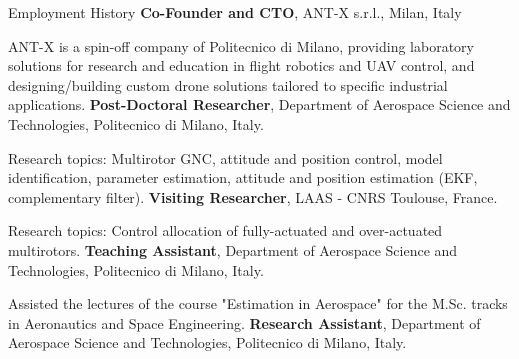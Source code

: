 \begin{rubric}{Employment History}
\entry*[02/20 -- 06/24]
	\textbf{Co-Founder and CTO}, ANT-X s.r.l., Milan, Italy

    ANT-X is a spin-off company of Politecnico di Milano, providing laboratory solutions for research and education in flight robotics and UAV control, and designing/building custom drone solutions tailored to specific industrial applications.    
%
\entry*[02/20 -- 10/22]
	\textbf{Post-Doctoral Researcher}, Department of Aerospace Science and Technologies, Politecnico di Milano, Italy.

    Research topics: Multirotor GNC, attitude and position control, model identification, parameter estimation, attitude and position estimation (EKF, complementary filter). 
%
\entry*[03/19 -- 07/19]
	\textbf{Visiting Researcher}, LAAS - CNRS Toulouse, France.
 
   Research topics: Control allocation of fully-actuated and over-actuated multirotors.
%
\entry*[2018 -- 2019]
	\textbf{Teaching Assistant}, Department of Aerospace Science and Technologies, Politecnico di Milano, Italy.
 
   Assisted the lectures of the course "Estimation in Aerospace" for the M.Sc. tracks in Aeronautics and Space Engineering.
%
\entry*[01/16 -- 11/16]
	\textbf{Research Assistant}, Department of Aerospace Science and Technologies, Politecnico di Milano, Italy.
%
\end{rubric}
